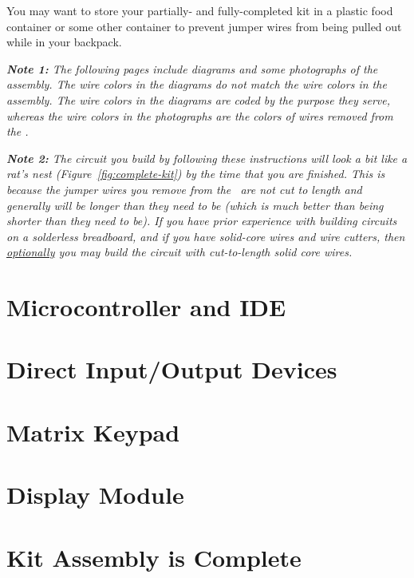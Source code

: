     You may want to store your partially- and fully-completed kit in a plastic food container or some other container to prevent jumper wires from being pulled out while in your backpack.

    \textit{
        \textbf{Note 1:} The following pages include diagrams and some photographs of the assembly.
        The wire colors in the diagrams do not match the wire colors in the assembly.
        The wire colors in the diagrams are coded by the purpose they serve, whereas the wire colors in the photographs are the colors of wires removed from the \rainbow.
    }

    \textit{
        \textbf{Note 2:} The circuit you build by following these instructions will look a bit like a rat's nest (Figure~\ref{fig:complete-kit}) by the time that you are finished.
        This is because the jumper wires you remove from the \rainbow\ are not cut to length and generally will be longer than they need to be (which is much better than being shorter than they need to be).
        If you have prior experience with building circuits on a solderless breadboard, and if you have solid-core wires and wire cutters, then \underline{optionally} you may build the circuit with cut-to-length solid core wires.
    }

\section{Microcontroller and IDE}                           

\section{Direct Input/Output Devices}                       

\section{Matrix Keypad} \label{sec:keypad}                  

\section{Display Module}                                    

\section*{Kit Assembly is Complete}


